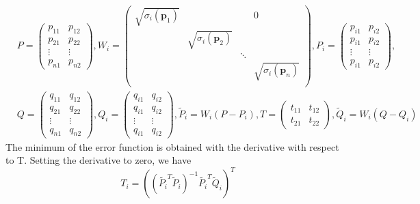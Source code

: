 \documentclass{article}
\begin{document}
\begin{equation}
    \begin{split}
        &P=\left(
        \begin{array}{cc}
                p_{11} & p_{12} \\
                p_{21} & p_{22} \\
                \vdots & \vdots \\
                p_{n1} & p_{n2}
            \end{array}
        \right),W_i=\left(
        \begin{array}{cccc}
                \sqrt{\sigma_i(\mathbf{p}_1)} &                               &        & 0                             \\
                                              & \sqrt{\sigma_i(\mathbf{p}_2)} &        &                               \\
                                              &                               & \ddots &                               \\
                                              &                               &        & \sqrt{\sigma_i(\mathbf{p}_n)} \\
            \end{array}
        \right),P_i=\left(
        \begin{array}{cc}
                p_{i1} & p_{i2} \\
                p_{i1} & p_{i2} \\
                \vdots & \vdots \\
                p_{i1} & p_{i2}
            \end{array}
        \right),\\
        &Q=\left(
        \begin{array}{cc}
                q_{11} & q_{12} \\
                q_{21} & q_{22} \\
                \vdots & \vdots \\
                q_{n1} & q_{n2}
            \end{array}
        \right),Q_i=\left(
        \begin{array}{cc}
                q_{i1} & q_{i2} \\
                q_{i1} & q_{i2} \\
                \vdots & \vdots \\
                q_{i1} & q_{i2}
            \end{array}
        \right),\tilde{P}_i=W_i(P-P_i),T=\left(
        \begin{array}{cc}
                t_{11} & t_{12} \\
                t_{21} & t_{22}
            \end{array}
        \right),\tilde{Q}_i=W_i(Q-Q_i)
    \end{split}
\end{equation}
The minimum of the error function is obtained with the derivative with respect to T. Setting the derivative to zero, we have
\begin{equation}
    T_i=((\tilde{P_i}^T\tilde{P}_i)^{-1}\tilde{P_i}^T\tilde{Q}_i)^T
\end{equation}
\end{document}
